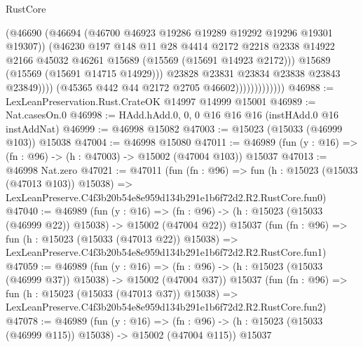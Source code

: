 \begin{lexlean}{RustCore}
\begin{coremodule}
                                    (@46690
                                      (@46694
                                        (@46700 @46923 @19286 @19289 @19292 @19296 @19301 @19307))
                                      (@46230
                                        @197
                                        @148
                                        @11
                                        @28
                                        @4414
                                        @2172
                                        @2218
                                        @2338
                                        @14922
                                        @2166
                                        @45032
                                        @46261
                                        @15689
                                        (@15569 (@15691 @14923 @2172)))
                                      @15689
                                      (@15569 (@15691 @14715 @14929)))
                                    @23828
                                    @23831
                                    @23834
                                    @23838
                                    @23843
                                    @23849))))
                            (@45365 @442 @44 @2172 @2705 @46602)))))))))))))
@46988 := LexLeanPreservation.Rust.CrateOK @14997 @14999 @15001
@46989 := Nat.casesOn.{0}
@46998 := HAdd.hAdd.{0, 0, 0} @16 @16 @16 (instHAdd.{0} @16 instAddNat)
@46999 := @46998 @15082
@47003 := @15023 (@15033 (@46999 @103)) @15038
@47004 := @46998 @15080
@47011 := @46989 (fun (y : @16) => (fn : @96) -> (h : @47003) -> @15002 (@47004 @103)) @15037
@47013 := @46998 Nat.zero
@47021 := @47011
    (fun (fn : @96) =>
    fun (h : @15023 (@15033 (@47013 @103)) @15038) =>
    LexLeanPreserve.C4f3b20b54e8e959d134b291e1b6f72d2.R2.RustCore.fun0)
@47040 := @46989
    (fun (y : @16) =>
    (fn : @96) -> (h : @15023 (@15033 (@46999 @22)) @15038) -> @15002 (@47004 @22))
    @15037
    (fun (fn : @96) =>
    fun (h : @15023 (@15033 (@47013 @22)) @15038) =>
    LexLeanPreserve.C4f3b20b54e8e959d134b291e1b6f72d2.R2.RustCore.fun1)
@47059 := @46989
    (fun (y : @16) =>
    (fn : @96) -> (h : @15023 (@15033 (@46999 @37)) @15038) -> @15002 (@47004 @37))
    @15037
    (fun (fn : @96) =>
    fun (h : @15023 (@15033 (@47013 @37)) @15038) =>
    LexLeanPreserve.C4f3b20b54e8e959d134b291e1b6f72d2.R2.RustCore.fun2)
@47078 := @46989
    (fun (y : @16) =>
    (fn : @96) -> (h : @15023 (@15033 (@46999 @115)) @15038) -> @15002 (@47004 @115))
    @15037

\end{coremodule}
\end{lexlean}
